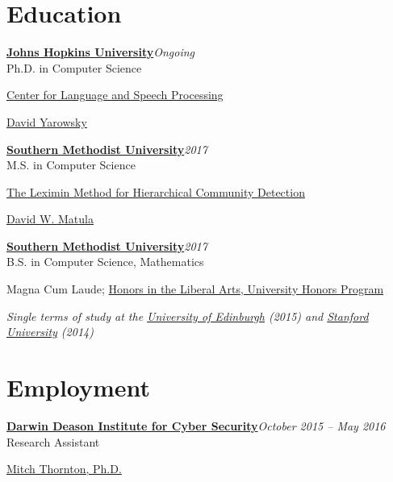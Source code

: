\documentclass[margin, 10pt]{res} %
\newcommand{\Year}[1]{\emph{#1}}
\newcommand{\uni}[1]{\textbf{#1}}
\newcommand{\eventYear}[2]{\uni{#1}\hfill{\Year{#2}}\\}
\newcommand{\JHU}{\href{https://www.jhu.edu/}{Johns Hopkins University}}
\newcommand{\SMU}{\href{https://www.smu.edu/}{Southern Methodist University}}
\newcommand{\HPHS}{\href{http://hs.hpisd.org}{Highland Park High School}}
\newcommand{\STAN}{\href{https://www.stanford.edu/}{Stanford University}}
\newcommand{\UOE}{\href{https://www.ed.ac.uk/}{University of Edinburgh}}
\newcommand{\CLSP}{\href{https://www.clsp.jhu.edu}{Center for Language and Speech Processing}}
\begin{document}
\begin{resume}
\section{Education}

\eventYear{\JHU}{Ongoing}
	Ph.D. in Computer Science
	\begin{description}[noitemsep, labelindent=1em]
	\item[Affiliation:] \CLSP
	\item[Advisor:] \href{http://www.cs.jhu.edu/~yarowsky/}{David Yarowsky}
	\end{description}

\eventYear{\SMU}{2017}
	M.S. in Computer Science
	\begin{description}[noitemsep, labelindent=1em]
	\item[Thesis:] \href{https://search.proquest.com/docview/1907180434?pq-origsite=gscholar}{The Leximin Method for Hierarchical Community Detection}
	\item[Advisor:] \href{https://lyle.smu.edu/~matula/}{David W. Matula}
	\end{description}
 
\eventYear{\SMU}{2017}
	B.S. in Computer Science, Mathematics
	\begin{description}[noitemsep, labelindent=0.5em]
	\item Magna Cum Laude; \href{http://www.smu.edu/dedman/studentresources/universityhonors}{Honors in the Liberal Arts, University Honors Program}
	\end{description}
	
	
\emph{Single terms of study at the \UOE{} (2015) and \STAN{} (2014)}



\section{Employment}

\begin{samepage}
\eventYear{\href{https://www.smu.edu/Lyle/Institutes/DeasonInstitute}{Darwin Deason Institute for Cyber Security}}{October 2015 -- May 2016}
Research Assistant
\begin{description}[nosep]
\item[Host:] \href{https://s2.smu.edu/~mitch/}{Mitch Thornton, Ph.D.}
\end{description}
\end{samepage}


\end{resume}
\end{document}
